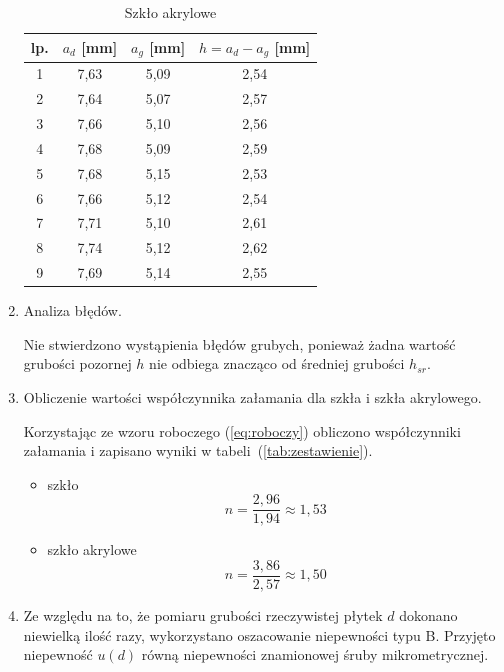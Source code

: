 \documentclass [a4paper,11pt]{article}
\begin{document}
\begin{enumerate}[label=\alph*)]
\begin{itemize}
		\end{itemize}
		\begin{table}[!h]
			\caption{Szkło akrylowe}
			\label{tab:pleksi}
			\begin{center}
				\begin{tabular}{|c|c|c|c|}
					\hline lp. & $a_d$  [mm] & $a_g$ [mm] & $h = a_d - a_g$ [mm]  \\
					\hline 1 & 7,63 & 5,09 & 2,54 \\
					\hline 2 & 7,64 & 5,07 & 2,57 \\
					\hline 3 & 7,66 & 5,10 & 2,56 \\
					\hline 4 & 7,68 & 5,09 & 2,59 \\
					\hline 5 & 7,68 & 5,15 & 2,53 \\
					\hline 6 & 7,66 & 5,12 & 2,54 \\
					\hline 7 & 7,71 & 5,10 & 2,61 \\
					\hline 8 & 7,74 & 5,12 & 2,62 \\
					\hline 9 & 7,69 & 5,14 & 2,55 \\
					\hline 
				\end{tabular} 
			\end{center}
		\end{table}
		
		
		
		
		\item Analiza błędów.
		
		Nie stwierdzono wystąpienia błędów grubych, ponieważ żadna wartość grubości pozornej $h$ nie odbiega znacząco od średniej grubości $h_{sr}$.
		
		\item Obliczenie wartości współczynnika załamania dla szkła i szkła akrylowego. 
		
		Korzystając ze wzoru roboczego (\ref{eq:roboczy}) obliczono współczynniki załamania i zapisano wyniki w tabeli~(\ref{tab:zestawienie}).
		\begin{itemize}
			\item szkło
			$$
			n=\frac{2,96}{1,94}\approx1,53
			$$
			\item szkło akrylowe
			$$
			n=\frac{3,86}{2,57}\approx1,50
			$$
		\end{itemize}
		
		\item Ze względu na to, że pomiaru grubości rzeczywistej płytek $d$ dokonano niewielką ilość razy, wykorzystano oszacowanie niepewności typu B. Przyjęto niepewność $u(d)$ równą niepewności znamionowej śruby mikrometrycznej.
		

\end{enumerate}
\end{document}
